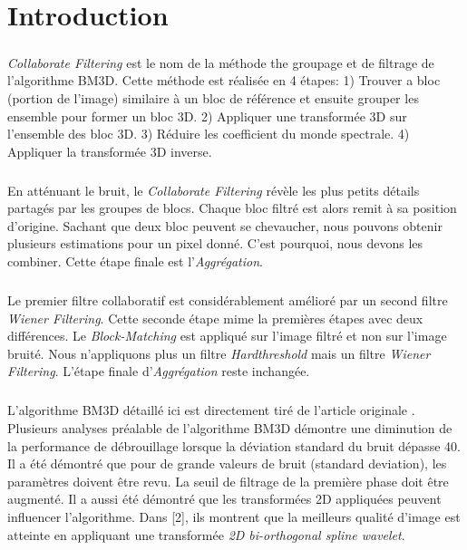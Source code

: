 
\chapter{Introduction}
\paragraph{}
\textit{Collaborate Filtering} est le nom de la méthode the groupage et de filtrage de l'algorithme BM3D. Cette méthode est réalisée en 4 étapes: 1) Trouver a bloc (portion de l'image) similaire à un bloc de référence et ensuite grouper les ensemble pour former un bloc 3D. 2) Appliquer une transformée 3D sur l'ensemble des bloc 3D. 3) Réduire les coefficient du monde spectrale. 4) Appliquer la transformée 3D inverse. 
\paragraph{}
En atténuant le bruit, le \textit{Collaborate Filtering} révèle les plus petits détails partagés par les groupes de blocs. Chaque bloc filtré est alors remit à sa position d'origine. Sachant que deux bloc peuvent se chevaucher, nous pouvons obtenir plusieurs estimations pour un pixel donné. C'est pourquoi, nous devons les combiner. Cette étape finale est l'\textit{Aggrégation}.
\paragraph{}
Le premier filtre collaboratif est considérablement amélioré par un second filtre \textit{Wiener Filtering}. Cette seconde étape mime la premières étapes avec deux différences. Le \textit{Block-Matching} est appliqué sur l'image filtré et non sur l'image bruité. Nous n'appliquons plus un filtre \textit{Hardthreshold} mais un filtre \textit{Wiener Filtering}. L'étape finale d'\textit{Aggrégation} reste inchangée.
\paragraph{}
L'algorithme BM3D détaillé ici est directement tiré de l'article originale \cite{b1}. Plusieurs analyses préalable de l'algorithme BM3D démontre une diminution de la performance de débrouillage lorsque la déviation standard du bruit dépasse 40. Il a été démontré que pour de grande valeurs de bruit (standard deviation), les paramètres doivent être revu. La seuil de filtrage de la première phase doit être augmenté. Il a aussi été démontré que les transformées 2D appliquées peuvent influencer l'algorithme. Dans [2], ils montrent que la meilleurs qualité d'image est atteinte en appliquant une transformée \textit{2D bi-orthogonal spline wavelet}. 
